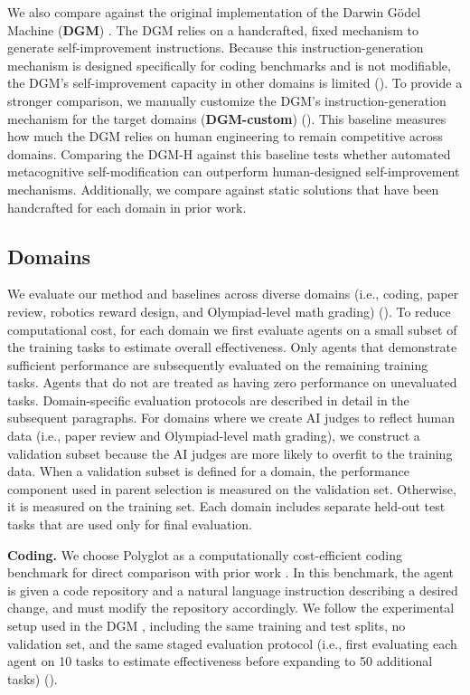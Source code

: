 \documentclass[]{fairmeta}
\begin{document}
We also compare against the original implementation of the Darwin G\"odel Machine (\textbf{DGM}) \citep{zhang2025darwin}. The DGM relies on a handcrafted, fixed mechanism to generate self-improvement instructions. Because this instruction-generation mechanism is designed specifically for coding benchmarks and is not modifiable, the DGM's self-improvement capacity in other domains is limited ().
To provide a stronger comparison, we manually customize the DGM's instruction-generation mechanism for the target domains (\textbf{DGM-custom}) (). This baseline measures how much the DGM relies on human engineering to remain competitive across domains. Comparing the DGM-H against this baseline tests whether automated metacognitive self-modification can outperform human-designed self-improvement mechanisms.
Additionally, we compare against static solutions that have been handcrafted for each domain in prior work.

\subsection{Domains}
\label{sec:domains}

We evaluate our method and baselines across diverse domains (i.e., coding, paper review, robotics reward design, and Olympiad-level math grading) (). To reduce computational cost, for each domain we first evaluate agents on a small subset of the training tasks to estimate overall effectiveness. Only agents that demonstrate sufficient performance are subsequently evaluated on the remaining training tasks. Agents that do not are treated as having zero performance on unevaluated tasks. Domain-specific evaluation protocols are described in detail in the subsequent paragraphs. For domains where we create AI judges to reflect human data (i.e., paper review and Olympiad-level math grading), we construct a validation subset because the AI judges are more likely to overfit to the training data. When a validation subset is defined for a domain, the performance component used in parent selection is measured on the validation set. Otherwise, it is measured on the training set. Each domain includes separate held-out test tasks that are used only for final evaluation.

\textbf{Coding.}
We choose Polyglot \citep{gauthier2024polyglot} as a computationally  cost-efficient coding benchmark for direct comparison with prior work \citep{zhang2025darwin}. In this benchmark, the agent is given a code repository and a natural language instruction describing a desired change, and must modify the repository accordingly. We follow the experimental setup used in the DGM \citep{zhang2025darwin}, including the same training and test splits, no validation set, and the same staged evaluation protocol (i.e., first evaluating each agent on 10 tasks to estimate effectiveness before expanding to 50 additional tasks) ().
\end{document}
